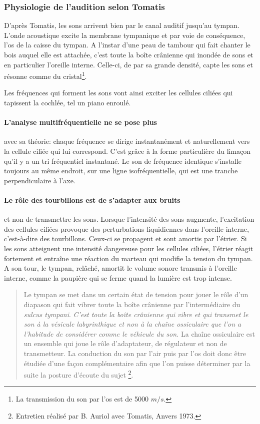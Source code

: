 \subsubsection{Physiologie de l'audition selon Tomatis}

D'après Tomatis, les sons arrivent bien par le canal auditif
jusqu'au tympan. L'onde acoustique excite la membrane tympanique et
par voie de conséquence, l'os de la caisse du tympan. 
A l'instar d'une
peau de tambour qui fait chanter le bois auquel elle est attachée,
c'est toute la boîte crânienne qui inondée de sons et en particulier
l'oreille interne. Celle-ci, de par sa grande densité, capte les sons
et résonne comme du cristal\footnote{La transmission du son par l'os est de 5000 $m/s$.}.

Les fréquences qui forment les sons vont ainsi exciter les cellules
ciliées qui tapissent la cochlée, tel un piano enroulé.

\paragraph{L'analyse multifréquentielle ne se pose plus}  
avec sa théorie: chaque fréquence se dirige instantanément et
 naturellement vers la cellule ciliée qui lui correspond. 
C'est grâce à la forme particulière du limaçon qu'il y a un tri fréquentiel instantané.
Le son de fréquence identique s'installe toujours au même endroit, sur une ligne isofréquentielle, qui est une tranche perpendiculaire à l'axe.


\paragraph{Le rôle des tourbillons est de s'adapter aux bruits}
et non de transmettre les sons.
Lorsque l'intensité des sons aug\-men\-te,
l'ex\-ci\-ta\-tion des cellules ciliées provoque des perturbations liquidiennes
dans l'oreille interne, c'est-à-dire des tourbillons. Ceux-ci se propagent
et sont amortis par l'étrier. Si les sons atteignent une intensité
dangereuse pour les cellules ciliées, l'étrier réagit fortement et
entraîne une réaction du marteau qui modifie la tension du tympan.
A son tour, le tympan, relâché, amortit le volume sonore transmis
à l'oreille interne, comme la paupière qui se ferme quand la lumière
est trop intense.


\begin{quotation}
Le tympan se met dans un certain état de tension pour jouer le
rôle d'un diapason qui fait vibrer toute la boîte crânienne
par l'intermédiaire du \emph{sulcus tympani}. 
\emph{C'est toute la boîte crânienne qui vibre et qui transmet le son à la vésicule labyrinthique et non à la chaîne ossiculaire que l'on a l'habitude de considérer comme le véhicule du son.} La chaîne ossiculaire est un ensemble qui
joue le rôle d'adaptateur, de régulateur et non de transmetteur. La
conduction du son par l'air puis par l'os doit donc
être étudiée d'une façon complémentaire afin que l'on
puisse déterminer par la suite la posture d'écoute du sujet%
\footnote{Entretien réalisé par B. Auriol avec Tomatis, Anvers 1973.}.
	
\end{quotation}


